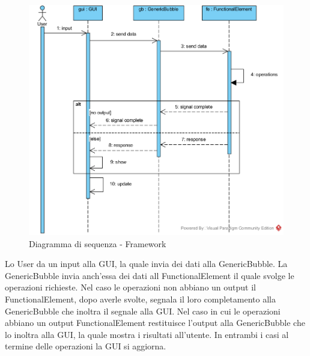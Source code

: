 \begin{figure}[H]
	\centering
	\includegraphics[width=14cm]{diagrammi_img/sequenza/framework.png}
	\caption{Diagramma di sequenza - Framework}
	\label{fig:seq_framework}
\end{figure}
Lo User da un input alla GUI, la quale invia dei dati alla GenericBubble. La GenericBubble invia anch'essa dei dati all FunctionalElement il quale svolge le operazioni richieste. Nel caso le operazioni non abbiano un output il FunctionalElement, dopo averle svolte, segnala il loro completamento alla GenericBubble che inoltra il segnale alla GUI. Nel caso in cui le operazioni abbiano un output FunctionalElement restituisce l'output alla GenericBubble che lo inoltra alla GUI, la quale mostra i risultati all'utente. In entrambi i casi al termine delle operazioni la GUI si aggiorna.
